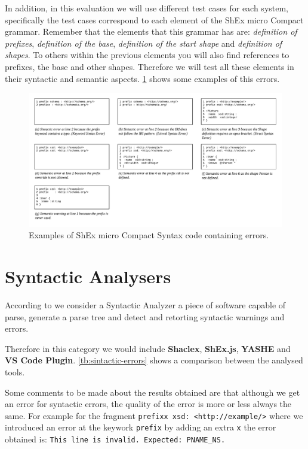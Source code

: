 In addition, in this evaluation we will use different test cases for each system, specifically the test cases
correspond to each element of the ShEx micro Compact grammar. Remember that the elements that this grammar has
are: \textit{definition of prefixes}, \textit{definition of the base}, \textit{definition of the start shape} and
\textit{definition of shapes}.
To others within the previous elements you will also find references to prefixes, the base and other shapes.
Therefore we will test all these elements in their syntactic and semantic aspects. \cref{fig:shexc-micro-errors}
shows some examples of this errors.

\begin{figure}
    \includegraphics[width=\textwidth]{images/shexc-micro-bad-examples.pdf}
    \centering
    \caption[Examples of ShEx micro Compact Syntax code containing syntactic and semantic errors or warnings]{Examples of ShEx micro Compact Syntax
    code containing errors.}
    \label{fig:shexc-micro-errors}
  \end{figure}

\section{Syntactic Analysers}
According to \cite{floyd1963syntactic} we consider a Syntactic Analyzer a piece of software capable of parse, generate
a parse tree and detect and retorting syntactic warnings and errors.

Therefore in this category we would include \textbf{Shaclex}, \textbf{ShEx.js}, \textbf{YASHE} and \textbf{VS Code Plugin}.
\cref{tb:sintactic-errors} shows a comparison between the analysed tools.

Some comments to be made about the results obtained are that although we get an error for syntactic errors,
the quality of the error is more or less always the same. For example for the fragment \texttt{prefixx xsd: <http://example/>}
where we introduced an error at the keywork \texttt{prefix} by adding an extra \texttt{x} the error obtained is: \texttt{This line is invalid. Expected: PNAME\_NS.}

